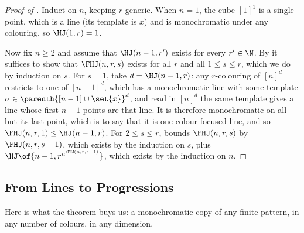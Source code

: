 \begin{proof}[Proof of ]
    Induct on $n$, keeping $r$ generic. When $n = 1$, the cube $[1]^1$ is a single point, which is a line (its template is $x$) and is monochromatic under any colouring, so $\HJ(1, r) = 1$.

    Now fix $n \geq 2$ and assume that $\HJ(n - 1, r')$ exists for every $r' \in \N$. By  it suffices to show that $\FHJ(n, r, s)$ exists for all $r$ and all $1 \leq s \leq r$, which we do by induction on $s$. For $s = 1$, take $d = \HJ(n - 1, r)$: any $r$-colouring of $[n]^d$ restricts to one of $[n - 1]^d$, which has a monochromatic line with some template $\sigma \in \parenth{[n - 1] \cup \set{x}}^d$, and read in $[n]^d$ the same template gives a line whose first $n - 1$ points are that line. It is therefore monochromatic on all but its last point, which is to say that it is one colour-focused line, and so $\FHJ(n, r, 1) \leq \HJ(n - 1, r)$. For $2 \leq s \leq r$,  bounds $\FHJ(n, r, s)$ by $\FHJ(n, r, s - 1)$, which exists by the induction on $s$, plus $\HJ\of{n - 1, r^{n^{\FHJ(n, r, s - 1)}}}$, which exists by the induction on $n$.
\end{proof}

\subsection{From Lines to Progressions}

Here is what the theorem buys us: a monochromatic copy of any finite pattern, in any number of colours, in any dimension.

